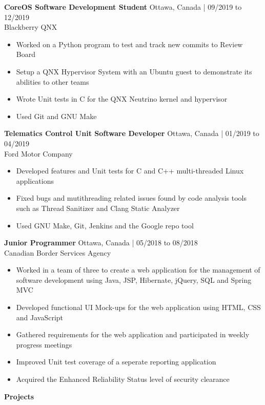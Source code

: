 \documentclass[10pt]{article}
\begin{document}
\textbf{CoreOS Software Development Student} \hfill Ottawa, Canada | 09/2019 to 12/2019 \\
Blackberry QNX
\begin{itemize}[noitemsep]
    \item Worked on a Python program to test and track new commits to Review Board
    \item Setup a QNX Hypervisor System with an Ubuntu guest to demonstrate its abilities to other teams
    \item Wrote Unit tests in C for the QNX Neutrino kernel and hypervisor
    \item Used Git and GNU Make
\end{itemize}

\textbf{Telematics Control Unit Software Developer} \hfill Ottawa, Canada | 01/2019 to 04/2019 \\
Ford Motor Company
\begin{itemize}[noitemsep]
    \item Developed features and Unit tests for C and C++ multi-threaded Linux applications
    \item Fixed bugs and mutithreading related issues found by code analysis tools such as Thread Sanitizer and Clang Static Analyzer
    \item Used GNU Make, Git, Jenkins and the Google repo tool
\end{itemize}

\textbf{Junior Programmer} \hfill Ottawa, Canada | 05/2018 to 08/2018 \\
Canadian Border Services Agency
\begin{itemize}[noitemsep]
    \item Worked in a team of three to create a web application for the management of software development using Java, JSP, Hibernate, jQuery, SQL and Spring MVC
    \item Developed functional UI Mock-ups for the web application using HTML, CSS and JavaScript
    \item Gathered requirements for the web application and participated in weekly progress meetings
    \item Improved Unit test coverage of a seperate reporting application
    \item Acquired the Enhanced Reliability Status level of security clearance
\end{itemize}

\newpage

{\Large\textbf{Projects}}\space \hrulefill
\end{document}

